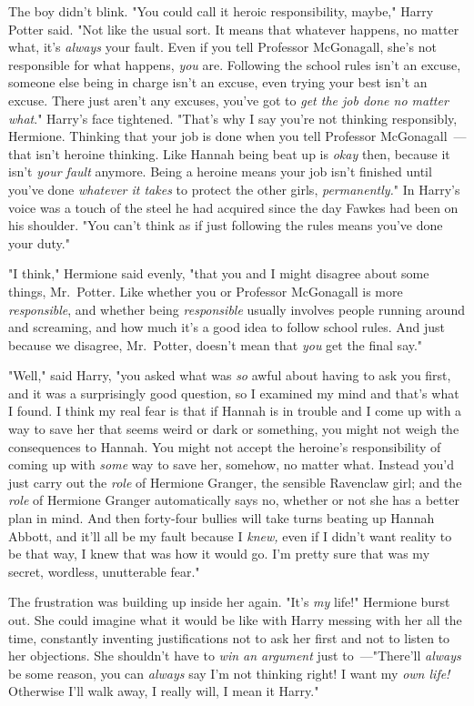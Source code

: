 The boy didn't blink. "You could call it heroic responsibility, maybe," Harry
Potter said. "Not like the usual sort. It means that whatever happens, no
matter what, it's \emph{always} your fault. Even if you tell Professor
McGonagall, she's not responsible for what happens, \emph{you} are. Following
the school rules isn't an excuse, someone else being in charge isn't an excuse,
even trying your best isn't an excuse. There just aren't any excuses, you've
got to \emph{get the job done no matter what}." Harry's face tightened. "That's
why I say you're not thinking responsibly, Hermione. Thinking that your job is
done when you tell Professor McGonagall~--- that isn't heroine thinking. Like
Hannah being beat up is \emph{okay} then, because it isn't \emph{your fault}
anymore. Being a heroine means your job isn't finished until you've done \emph{
whatever it takes} to protect the other girls, \emph{permanently.}" In Harry's
voice was a touch of the steel he had acquired since the day Fawkes had been on
his shoulder. "You can't think as if just following the rules means you've done
your duty."

"I think," Hermione said evenly, "that you and I might disagree about some
things, Mr.~Potter. Like whether you or Professor McGonagall is more
\emph{responsible}, and whether being \emph{responsible} usually involves
people running around and screaming, and how much it's a good idea to follow
school rules. And just because we disagree, Mr.~Potter, doesn't mean that
\emph{you} get the final say."

"Well," said Harry, "you asked what was \emph{so} awful about having to ask you
first, and it was a surprisingly good question, so I examined my mind and
that's what I found. I think my real fear is that if Hannah is in trouble and I
come up with a way to save her that seems weird or dark or something, you might
not weigh the consequences to Hannah. You might not accept the heroine's
responsibility of coming up with \emph{some} way to save her, somehow, no
matter what. Instead you'd just carry out the \emph{role} of Hermione Granger,
the sensible Ravenclaw girl; and the \emph{role} of Hermione Granger
automatically says no, whether or not she has a better plan in mind. And then
forty-four bullies will take turns beating up Hannah Abbott, and it'll all be
my fault because I \emph{knew,} even if I didn't want reality to be that way, I
knew that was how it would go. I'm pretty sure that was my secret, wordless,
unutterable fear."

The frustration was building up inside her again. "It's \emph{my} life!"
Hermione burst out. She could imagine what it would be like with Harry messing
with her all the time, constantly inventing justifications not to ask her first
and not to listen to her objections. She shouldn't have to \emph{win an
argument} just to~---"There'll \emph{always} be some reason, you can
\emph{always} say I'm not thinking right! I want my \emph{own life!} Otherwise
I'll walk away, I really will, I mean it Harry."

